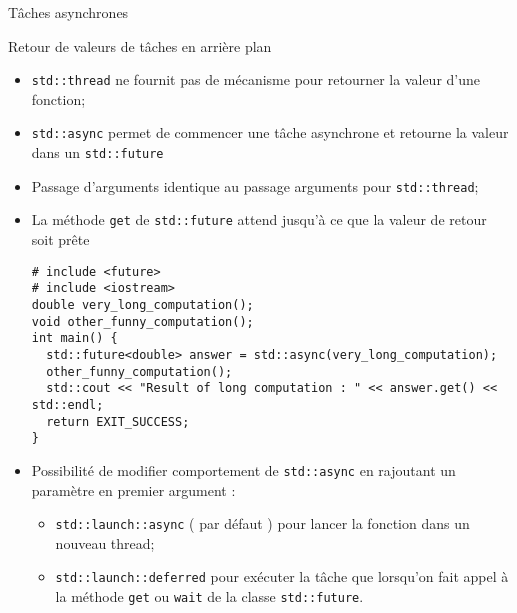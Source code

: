 \documentclass[handout,10pt]{beamer}
\begin{document}
\begin{frame}[fragile]{Tâches asynchrones}
 \tiny
 \begin{block}{Retour de valeurs de tâches en arrière plan}
 \begin{itemize}
  \item \lstinline$std::thread$ ne fournit pas de mécanisme pour retourner la valeur d'une fonction;
  \item \lstinline$std::async$ permet de commencer une tâche asynchrone et retourne la valeur dans un \lstinline$std::future$
  \item Passage d'arguments identique au passage arguments pour \lstinline$std::thread$;
  \item La méthode \lstinline$get$ de \lstinline$std::future$ attend jusqu'à ce que la valeur de retour soit prête
\begin{lstlisting}
# include <future>
# include <iostream>
double very_long_computation();
void other_funny_computation();
int main() {
  std::future<double> answer = std::async(very_long_computation);
  other_funny_computation();
  std::cout << "Result of long computation : " << answer.get() << std::endl;
  return EXIT_SUCCESS;
}
\end{lstlisting}
\item Possibilité de modifier comportement de \lstinline$std::async$ en rajoutant un paramètre en premier argument :
\begin{itemize}
\item \lstinline$std::launch::async$ ( par défaut ) pour lancer la fonction dans un nouveau thread;
\item \lstinline$std::launch::deferred$ pour exécuter la tâche que lorsqu'on fait appel à la méthode \lstinline$get$ ou \lstinline$wait$
de la classe \lstinline$std::future$.
\end{itemize}
 \end{itemize}
\end{block}
\end{frame}
\end{document}
